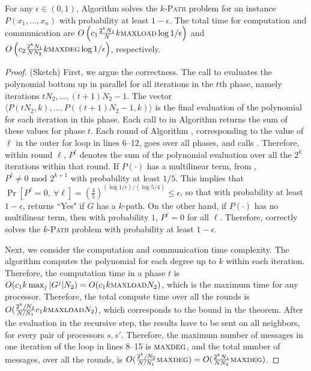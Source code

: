 \begin{theorem}
\label{thm:parmaxwt}
For any $\epsilon\in(0, 1)$,
Algorithm \parmaxwt{} solves the \textsc{$k$-Path} problem for an
instance $P(x_1,\ldots,x_n)$ with probability at least $1-\epsilon$. The total time for
computation and communication are $O\left(c_1\frac{2^kN_1}{N}k \textsc{maxload}{}\log{1/\epsilon}\right)$ 
and $O\left(c_2\frac{2^kN_1}{N N_2}k \textsc{maxdeg}{}\log{1/\epsilon}\right)$, respectively.
\end{theorem}
\begin{proof} (Sketch)
First, we argue the correctness. 
The call to \parcircuitpath{} evaluates the polynomial bottom up in parallel for all iterations in the
$t$th phase, namely iterations $tN_2,\ldots,(t+1)N_2-1$. The vector
$\langle P(tN_2, k),  \ldots ,P((t+1)N_2-1, k)\rangle$
is the final evaluation of the polynomial for each iteration in this phase.
Each call to \parcircuitpath{} in Algorithm \parmaxwt{}
returns the sum of these values for phase $t$.
Each round of Algorithm \parmaxwt{}, corresponding to the value of
$\ell$ in the outer for loop in lines 6--12, goes over all phases, and
calls \parcircuitpath{}. Therefore, within round $\ell$, $P^{\ell}$ denotes the
sum of the polynomial evaluation over all the $2^k$ iterations within that round.
If $P(\cdot)$ has a multilinear term,
from \cite{koutis:icalp08,williams2009finding}, $P^{\ell}\neq 0 \text{ mod }2^{k+1}$ with
probability at least $1/5$. This implies that 
$\Pr[P^{\ell} = 0,\ \forall \ell] = (\frac{4}{5})^{(\log{1/\epsilon})/(\log{5/4})}\leq\epsilon$,
so that with probability at least $1-\epsilon$, \parmaxwt{} returns ``Yes" if $G$ has a $k$-path.  On the other hand,
if $P(\cdot)$ has no multilinear term, then with probability $1$, $P^{\ell}=0$ for all $\ell$.
Therefore, \parmaxwt{} correctly solves the \textsc{$k$-Path} problem with probability
at least $1-\epsilon$.

Next, we consider the computation and communication time complexity. 
The algorithm \parcircuitpath{} computes the polynomial for each degree up to $k$ within each iteration.
Therefore, the computation time in a phase $t$ is 
$O(c_1 k \max_j |G^j| N_2) = O(c_1k\textsc{maxload}{}N_2)$, which is the maximum time for any processor. Therefore, the total compute time over all the rounds is
$O(\frac{2^k/N_2}{N/N_1} c_1 k \textsc{maxload}{} N_2)$, which corresponds to the bound in the theorem.
After the evaluation in the recursive step, the results have to be sent on all neighbors, for every pair of
processors $s, s'$. Therefore, the maximum number of messages in one iteration of the loop in lines 8--15 is $\textsc{maxdeg}{}$, and the total number of messages, over all the rounds, is
$O(\frac{2^k/N_2}{N/N_1} \textsc{maxdeg}{}) = O(\frac{2^kN_1}{N N_2} \textsc{maxdeg}{})$.
\end{proof}

